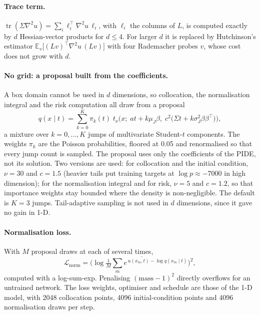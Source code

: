 \paragraph{Trace term.} $\operatorname{tr}(\Sigma\nabla^2 u) = \sum_i \ell_i^\top \nabla^2 u\, \ell_i$, with
$\ell_i$ the columns of $L$, is computed exactly by $d$ Hessian-vector products for $d \le 4$. For larger $d$ it
is replaced by Hutchinson's estimator $\mathbb{E}_v\big[(Lv)^\top \nabla^2 u\,(Lv)\big]$ with four Rademacher
probes $v$, whose cost does not grow with $d$.

\paragraph{No grid: a proposal built from the coefficients.} A box domain cannot be used in $d$ dimensions,
so collocation, the normalisation integral and the risk computation all draw from a proposal
\begin{equation}
  q(x \mid t) = \sum_{k=0}^{K} \pi_k(t)\; t_\nu\!\Big(x;\; a t + k\mu_J\beta,\;
                c^2\big(\Sigma t + k\sigma_J^2 \beta\beta^\top\big)\Big),
  \label{eq:proposal}
\end{equation}
a mixture over $k = 0,\dots,K$ jumps of multivariate Student-$t$ components. The weights $\pi_k$ are the Poisson
probabilities, floored at 0.05 and renormalised so that every jump count is sampled. The proposal uses only the
coefficients of the PIDE, not its solution. Two versions are used: for collocation and the initial condition,
$\nu = 30$ and $c = 1.5$ (heavier tails put training targets at $\log p \approx -7000$ in high dimension); for
the normalisation integral and for risk, $\nu = 5$ and $c = 1.2$, so that importance weights stay bounded where
the density is non-negligible. The default is $K = 3$ jumps. Tail-adaptive sampling is not used in $d$
dimensions, since it gave no gain in 1-D.

\paragraph{Normalisation loss.} With $M$ proposal draws at each of several times,
\begin{equation}
  \mathcal{L}_{\mathrm{norm}} = \overline{\Big(\log \tfrac1M \textstyle\sum_m e^{\,u(x_m,t) - \log q(x_m \mid t)}\Big)^2},
\end{equation}
computed with a log-sum-exp. Penalising $(\text{mass} - 1)^2$ directly overflows for an untrained network.
The loss weights, optimiser and schedule are those of the 1-D model, with 2048 collocation points, 4096
initial-condition points and 4096 normalisation draws per step.

